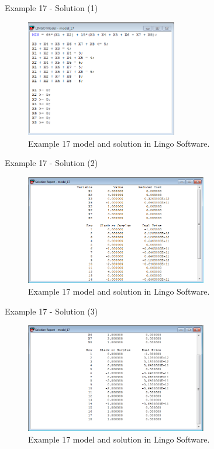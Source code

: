 \begin{frame}{Example 17 - Solution (1)}
\begin{figure}
    \includegraphics[width=250px]{slides/ex17/screenshot_a.png}
    \caption{Example 17 model and solution in Lingo Software.}
\end{figure}
\end{frame}

\begin{frame}{Example 17 - Solution (2)}
\begin{figure}
    \includegraphics[width=300px]{slides/ex17/screenshot_b.png}
    \caption{Example 17 model and solution in Lingo Software.}
\end{figure}
\end{frame}


\begin{frame}{Example 17 - Solution (3)}
\begin{figure}
    \includegraphics[width=300px]{slides/ex17/screenshot_c.png}
    \caption{Example 17 model and solution in Lingo Software.}
\end{figure}
\end{frame}

